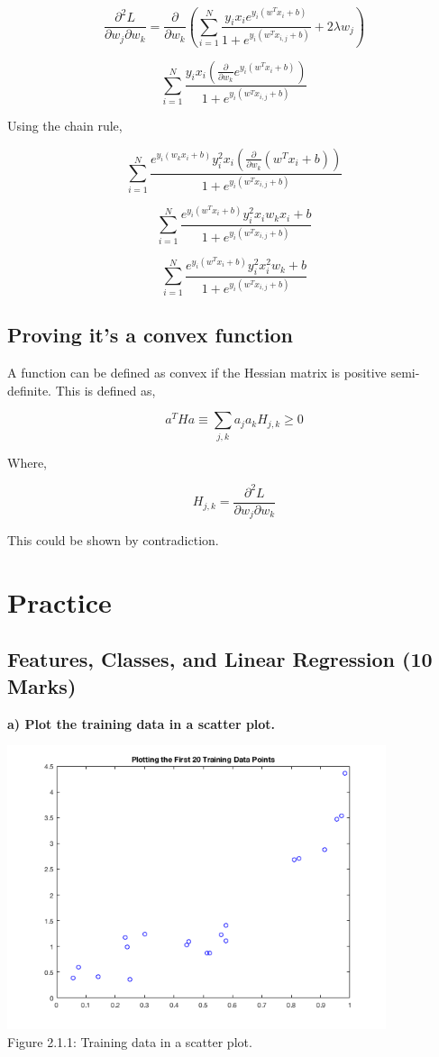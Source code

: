 \documentclass[]{scrreprt}   %
\begin{document}
$$\frac{\partial^2 L}{\partial w_j\partial w_k}=\frac{\partial}{\partial w_k}(\sum_{i=1}^{N}\frac{y_ix_ie^{y_i(w^Tx_i+b)}}{1+e^{y_i(w^Tx_{i,j}+b)}}+2\lambda w_j)$$


$$\sum_{i=1}^{N}\frac{y_ix_i(\frac{\partial}{\partial w_k}e^{y_i(w^Tx_i+b)})}{1+e^{y_i(w^Tx_{i,j}+b)}}$$

Using the chain rule,

$$\sum_{i=1}^{N}\frac{e^{y_i(w_kx_i+b)}y_i^2x_i(\frac{\partial}{\partial w_k}(w^Tx_i+b))}{1+e^{y_i(w^Tx_{i,j}+b)}}$$

$$\sum_{i=1}^{N}\frac{e^{y_i(w^Tx_i+b)}y_i^2x_iw_kx_i+b}{1+e^{y_i(w^Tx_{i,j}+b)}}$$

$$\sum_{i=1}^{N}\frac{e^{y_i(w^Tx_i+b)}y_i^2x_i^2w_k+b}{1+e^{y_i(w^Tx_{i,j}+b)}}$$


\section{Proving it's a convex function}

A function can be defined as convex if the Hessian matrix is positive semi-definite. This is defined as,

$$a^THa\equiv\sum_{j,k}a_ja_kH_{j,k}\geq0$$

Where,

$$H_{j,k}=\frac{\partial^2L}{\partial w_j\partial w_k}$$

This could be shown by contradiction.
\chapter{Practice}

\section{Features, Classes, and Linear Regression (10 Marks)}
\textbf{a) Plot the training data in a scatter plot.}
\begin{center}
	\includegraphics[width=30em,keepaspectratio]{p1figure1.png}\\
	{Figure 2.1.1: Training data in a scatter plot.}
\end{center} 
\end{document}
